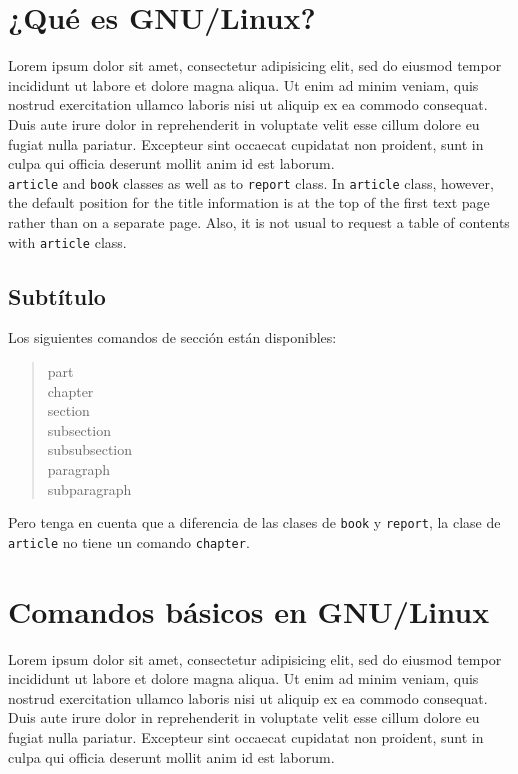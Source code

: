 \documentclass[11pt, oneside]{book}
\begin{document}
\chapter{¿Qué es GNU/Linux?}
Lorem ipsum dolor sit amet, consectetur adipisicing elit, sed do eiusmod tempor incididunt ut labore et dolore magna aliqua. Ut enim ad minim veniam, quis nostrud exercitation ullamco laboris nisi ut aliquip ex ea commodo consequat. Duis aute irure dolor in reprehenderit in voluptate velit esse cillum dolore eu fugiat nulla pariatur. Excepteur sint occaecat cupidatat non proident, sunt in culpa qui officia deserunt mollit anim id est laborum.\\
 \texttt{article} and \texttt{book} classes
as well as to \texttt{report} class. In \texttt{article} class, however,
the default position for the title information is at the top of
the first text page rather than on a separate page. Also, it is
not usual to request a table of contents with \texttt{article} class.

\section{Subtítulo}
Los siguientes comandos de sección están disponibles:
\begin{quote}
 part \\
 chapter \\%
 section \\
 subsection \\
 subsubsection \\
 paragraph \\
 subparagraph
\end{quote}%

Pero tenga en cuenta que  a diferencia de las clases de \texttt{book} y \texttt{report},
la clase de \texttt{article} no tiene un comando \texttt{chapter}.

\chapter{Comandos básicos en GNU/Linux}
Lorem ipsum dolor sit amet, consectetur adipisicing elit, sed do eiusmod tempor incididunt ut labore et dolore magna aliqua. Ut enim ad minim veniam, quis nostrud exercitation ullamco laboris nisi ut aliquip ex ea commodo consequat. Duis aute irure dolor in reprehenderit in voluptate velit esse cillum dolore eu fugiat nulla pariatur. Excepteur sint occaecat cupidatat non proident, sunt in culpa qui officia deserunt mollit anim id est laborum.
\end{document}
